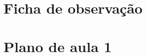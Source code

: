 \documentclass[a4paper, 12 pt]{article}                                	%
\begin{document}
	\section{Ficha de observação}  %
	\label{ap:ficha}
	


	\section{Plano de aula 1}
	\label{ap:plano1}  
	
\end{document}
